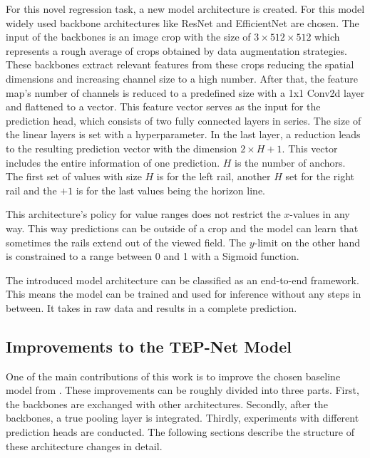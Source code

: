 For this novel regression task, a new model architecture is created.
For this model widely used backbone architectures like ResNet and EfficientNet are chosen.
The input of the backbones is an image crop with the size of $3 \times 512 \times 512$ which represents a rough average of crops obtained by data augmentation strategies.
These backbones extract relevant features from these crops reducing the spatial dimensions and increasing channel size to a high number.
After that, the feature map's number of channels is reduced to a predefined size with a 1x1 Conv2d layer \cite{pytorch_conv2d_docu} and flattened to a vector.
This feature vector serves as the input for the prediction head, which consists of two fully connected layers \cite{pytorch_linearLayer_docu} in series.
The size of the linear layers is set with a hyperparameter.
In the last layer, a reduction leads to the resulting prediction vector with the dimension $2 \times H + 1$.
This vector includes the entire information of one prediction.
$H$ is the number of anchors.
The first set of values with size $H$ is for the left rail, another $H$ set for the right rail and the $+ 1$ is for the last values being the horizon line.

This architecture's policy for value ranges does not restrict the $x$-values in any way.
This way predictions can be outside of a crop and the model can learn that sometimes the rails extend out of the viewed field.
The $y$-limit on the other hand is constrained to a range between 0 and 1 with a Sigmoid function.

The introduced model architecture can be classified as an end-to-end framework.
This means the model can be trained and used for inference without any steps in between.
It takes in raw data and results in a complete prediction.


\subsection{Improvements to the TEP-Net Model}
\label{subsec:improvemensts2BaselineModel}

One of the main contributions of this work is to improve the chosen baseline model from \cite{tepNet2024}.
These improvements can be roughly divided into three parts.
First, the backbones are exchanged with other architectures.
Secondly, after the backbones, a true pooling layer is integrated.
Thirdly, experiments with different prediction heads are conducted.
The following sections describe the structure of these architecture changes in detail.


